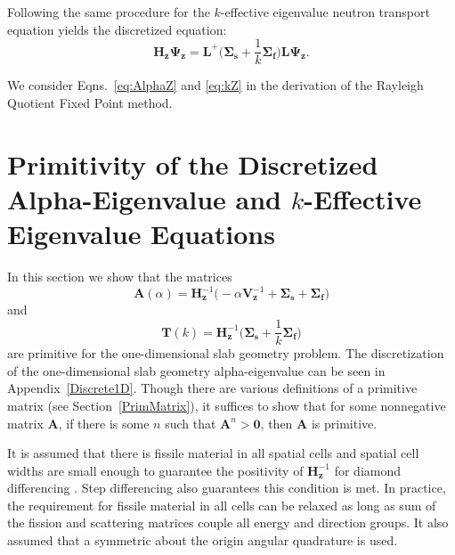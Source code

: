 Following the same procedure for the $k$-effective eigenvalue neutron transport equation yields the discretized equation:
\begin{equation}
	\boxed{\mathbf{H_{z}} \mathbf{\Psi_{z}} = \mathbf{L}^{+} \bigg ( \mathbf{\Sigma_{s}} + \frac{1}{k}\mathbf{\Sigma_{f}} \bigg ) \mathbf{L} \mathbf{\Psi_{z}}.}
	\label{eq:kZ}
\end{equation}

We consider Eqns.~\ref{eq:AlphaZ} and \ref{eq:kZ} in the derivation of the Rayleigh Quotient Fixed Point method.


%

\section{Primitivity of the Discretized Alpha-Eigenvalue and $k$-Effective Eigenvalue Equations}
\label{sec:PrimPos}

In this section we show that the matrices 
\begin{equation}
\mathbf{A}(\alpha) = \mathbf{H}_{\mathbf{z}}^{-1} \big (-\alpha \mathbf{V}_{\mathbf{z}}^{-1} + \mathbf{\Sigma_{s}} + \mathbf{\Sigma_{f}} \big)
\end{equation}
and
\begin{equation}
\mathbf{T}(k) = \mathbf{H}_{\mathbf{z}}^{-1} \bigg (\mathbf{\Sigma_{s}} + \frac{1}{k}\mathbf{\Sigma_{f}} \bigg)
\end{equation}
are primitive for the one-dimensional slab geometry problem. The discretization of the one-dimensional slab geometry alpha-eigenvalue can be seen in Appendix~\ref{Discrete1D}. Though there are various definitions of a primitive matrix (see Section~\ref{PrimMatrix}), it suffices to show that for some nonnegative matrix $\mathbf{A}$, if there is some $n$ such that $\mathbf{A}^{n} > \mathbf{0}$, then $\mathbf{A}$ is primitive.

It is assumed that there is fissile material in all spatial cells and spatial cell widths are small enough to guarantee the positivity of $\mathbf{H}_{\mathbf{z}}^{-1}$ for diamond differencing \cite{greenbaum_iterative_1997}. Step differencing also guarantees this condition is met. In practice, the requirement for fissile material in all cells can be relaxed as long as sum of the fission and scattering matrices couple all energy and direction groups. It also assumed that a symmetric about the origin angular quadrature is used.

